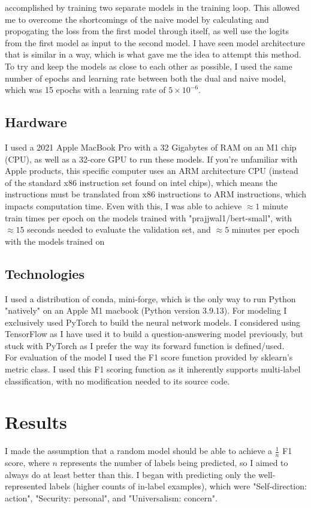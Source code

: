 \documentclass[11pt,a4paper]{article}
\begin{document}
accomplished by training two separate models in the training loop. 
This 
allowed me to overcome the shortcomings of the naive model by calculating and propogating the loss from the first 
model through itself, as well use the logits from the first model as input to the second model. I have seen model
architecture that is similar in a way, which is what gave me the idea to attempt this method. \\
\indent To try and keep the models as close to each other as possible, I used the same number of epochs and learning 
rate between both the dual and naive model, which was 15 epochs with a learning rate of $5\times 10^{-6}$.

\subsection{Hardware}
I used a 2021 Apple MacBook Pro with a 32 Gigabytes of RAM on an M1 chip (CPU), as well as a 32-core GPU to run 
these models. If you're unfamiliar with Apple products, this specific computer uses an ARM architecture CPU 
(instead of the standard x86 instruction set found on intel chips), which means the instructions must be 
translated from x86 instructions to ARM instructions, which impacts computation time. Even with this, I was able 
to achieve $\approx 1$ minute train times per epoch on the models trained with "prajjwal1/bert-small", with 
$\approx 15$ seconds needed to evaluate the validation set, and $\approx 5$ minutes per epoch with the models trained
on 

\subsection{Technologies}
I used a distribution of conda, mini-forge, which is the only way to run Python "natively" on an Apple M1 macbook 
(Python version 3.9.13). For modeling I exclusively used PyTorch to build the neural network models. I considered 
using TensorFlow as I have used it to build a question-answering model previously, but stuck with PyTorch as I prefer
the way its forward function is defined/used. \\
\indent For evaluation of the model I used the F1 score function provided by sklearn's metric class. I used this F1 scoring 
function as it inherently supports multi-label classification, with no modification needed to its source code.

\section{Results}
I made the assumption that a random model should be able to achieve a $\frac{1}{n}$ F1 score, where $n$ represents
the number of labels being predicted, so I aimed to always do at least better than this. I began with predicting 
only the well-represented labels (higher counts of in-label examples), which were "Self-direction: action", 
"Security: personal", and "Universalism: concern".
\end{document}
